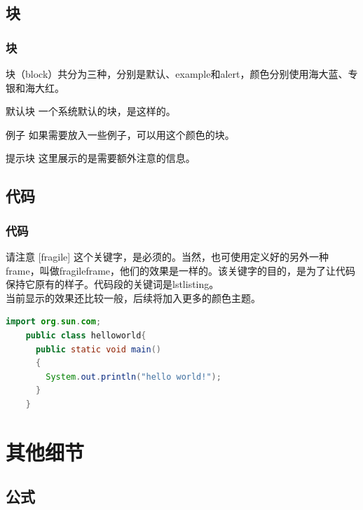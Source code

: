 \documentclass[aspectratio=169,UTF8,t]{beamer}%
\begin{document}
\subsection{块}

\begin{frame}
    \frametitle{块}
    块（block）共分为三种，分别是默认、example和alert，颜色分别使用海大蓝、专银和海大红。
    \begin{block}{默认块}
        一个系统默认的块，是这样的。
    \end{block}

    \begin{exampleblock}{例子}
        如果需要放入一些例子，可以用这个颜色的块。
    \end{exampleblock}

    \begin{alertblock}{提示块}
        这里展示的是需要额外注意的信息。
    \end{alertblock}
\end{frame}

\subsection{代码}

\begin{frame}[fragile]
    \frametitle{代码}
    
    请注意 [fragile] 这个关键字，是必须的。当然，也可使用定义好的另外一种frame，叫做fragileframe，他们的效果是一样的。该关键字的目的，是为了让代码保持它原有的样子。代码段的关键词是lstlisting。\\
    当前显示的效果还比较一般，后续将加入更多的颜色主题。

\begin{lstlisting}[language=Java,caption={src/app/app.module.ts}]
    import org.sun.com;   
    public class helloworld{
      public static void main()
      {
        System.out.println("hello world!");
      }
    }
    \end{lstlisting}
\end{frame}

\section{其他细节}

\subsection{公式}
\end{document}
